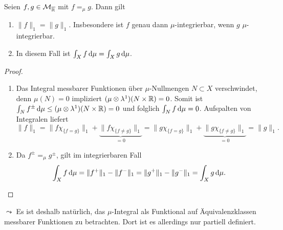 \begin{lemma}
\begin{mdframed}
Seien $f,g \in \mathcal{M}_{\overline{\mathbb{R}}}$ mit $f=_\mu g$. Dann gilt
\begin{enumerate}
\item $\|f\|_1=\|g\|_1$. Insbesondere ist $f$ genau dann $\mu$-integrierbar, wenn $g$ $\mu$-integrierbar.
\item In diesem Fall ist $\int_X f \, \mathrm{d}\mu =\int_X g \, \mathrm{d} \mu$.
\end{enumerate}
\end{mdframed}
\begin{proof}
\begin{enumerate}
\item Das Integral messbarer Funktionen über $\mu$-Nullmengen $N\subset X$ verschwindet, denn $\mu(N)=0$ impliziert $(\mu\otimes \lambda^1)(N\times \mathbb{R})=0$. Somit ist ${\int_Nf^\pm \, \mathrm{d}\mu}\leq (\mu \otimes \lambda^1)(N\times \mathbb{R})=0$ und folglich $\int_N f\, \mathrm{d}\mu=0$. Aufspalten von Integralen liefert
$$
\|f\|_1=\|f\chi_{\{f=g\}}\|_1+\underbrace{\|f\chi_{\{f\neq g\}}\|_1}_{=0}= \|g\chi_{\{f=g\}}\|_1+\underbrace{\|g\chi_{\{f\neq g\}}\|_1}_{=0}=\|g\|_1.
$$
\item Da $f^\pm=_\mu g^\pm$, gilt im integrierbaren Fall
$$
\int_Xf\, \mathrm{d}\mu =\|f^+\|_1-\|f^-\|_1=\|g^+\|_1-\|g^-\|_1=\int_X g\, \mathrm{d} \mu.
$$
\end{enumerate}
\end{proof}
\end{lemma}
$\leadsto$ Es ist deshalb natürlich, das $\mu$-Integral als Funktional auf Äquivalenzklassen messbarer Funktionen zu betrachten. Dort ist es allerdings nur partiell definiert.
%

